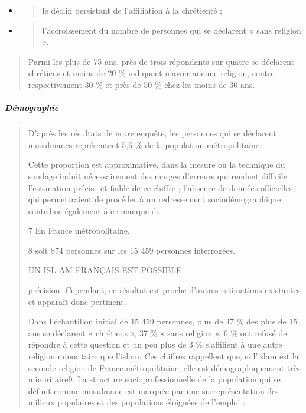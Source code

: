 \begin{itemize}
\item
  \begin{quote}
  le déclin persistant de l'affiliation à la chrétienté ;
  \end{quote}
\item
  \begin{quote}
  l'accroissement du nombre de personnes qui se déclarent « sans
  religion ».
  \end{quote}
\end{itemize}

\begin{quote}
Parmi les plus de 75 ans, près de trois répondants sur quatre se
déclarent chrétiens et moins de 20 \% indiquent n'avoir aucune religion,
contre respectivement 30 \% et près de 50 \% chez les moins de 30 ans.
\end{quote}

\hypertarget{duxe9mographie}{%
\subparagraph{Démographie}\label{duxe9mographie}}

\begin{quote}
D'après les résultats de notre enquête, les personnes qui se déclarent
musulmanes représentent 5,6 \% de la population métropolitaine.

Cette proportion est approximative, dans la mesure où la technique du
sondage induit nécessairement des marges d'erreurs qui rendent difficile
l'estimation précise et fiable de ce chiffre ; l'absence de données
officielles, qui permettraient de procéder à un redressement
sociodémographique, contribue également à ce manque de

7 En France métropolitaine.

8 soit 874 personnes sur les 15 459 personnes interrogées.

UN ISL AM FRANÇAIS EST POSSIBLE

précision. Cependant, ce résultat est proche d'autres estimations
existantes et apparaît donc pertinent.

Dans l'échantillon initial de 15 459 personnes, plus de 47 \% des plus
de 15 ans se déclarent « chrétiens », 37 \% « sans religion », 6 \% ont
refusé de répondre à cette question et un peu plus de 3 \% s'affilient à
une autre religion minoritaire que l'islam. Ces chiffres rappellent que,
si l'islam est la seconde religion de France métropolitaine, elle est
démographiquement très minoritaire9. La structure socioprofessionnelle
de la population qui se définit comme musulmane est marquée par une
surreprésentation des milieux populaires et des populations éloignées de
l'emploi :
\end{quote}

